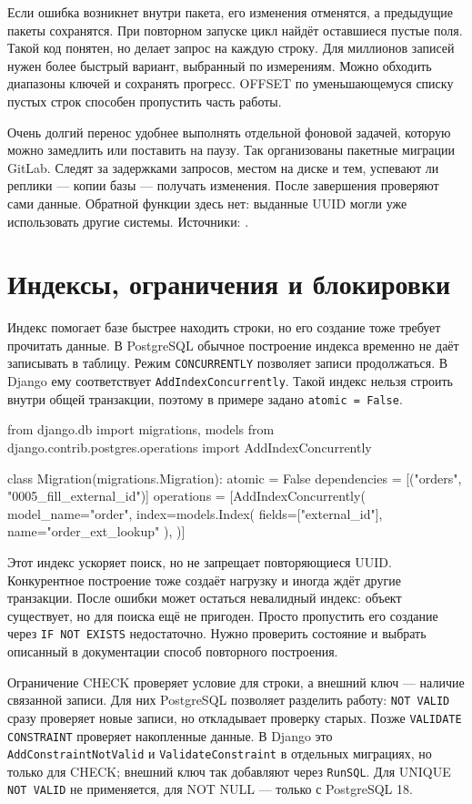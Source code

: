 \documentclass[11pt,a4paper]{article}
\newcommand{\src}[1]{{\small\color{muted}Источники: #1.}}
\newcommand{\parthead}[1]{\Needspace{10\baselineskip}\section{#1}}
\begin{document}
Если ошибка возникнет внутри пакета, его изменения отменятся, а предыдущие пакеты сохранятся. При повторном запуске цикл найдёт оставшиеся пустые поля. Такой код понятен, но делает запрос на каждую строку. Для миллионов записей нужен более быстрый вариант, выбранный по измерениям. Можно обходить диапазоны ключей и сохранять прогресс. OFFSET по уменьшающемуся списку пустых строк способен пропустить часть работы.

Очень долгий перенос удобнее выполнять отдельной фоновой задачей, которую можно замедлить или поставить на паузу. Так организованы пакетные миграции GitLab. Следят за задержками запросов, местом на диске и тем, успевают ли реплики --- копии базы --- получать изменения. После завершения проверяют сами данные. Обратной функции здесь нет: выданные UUID могли уже использовать другие системы.
\src{\cite{writing,transactions,querysets,gitlabbatches}}

\parthead{Индексы, ограничения и блокировки}

Индекс помогает базе быстрее находить строки, но его создание тоже требует прочитать данные. В PostgreSQL обычное построение индекса временно не даёт записывать в таблицу. Режим \texttt{CONCURRENTLY} позволяет записи продолжаться. В Django ему соответствует \texttt{AddIndex\allowbreak Concurrently}. Такой индекс нельзя строить внутри общей транзакции, поэтому в примере задано \texttt{atomic = False}.
\begin{code}
from django.db import migrations, models
from django.contrib.postgres.operations import AddIndexConcurrently

class Migration(migrations.Migration):
    atomic = False
    dependencies = [("orders", "0005_fill_external_id")]
    operations = [AddIndexConcurrently(
        model_name="order",
        index=models.Index(
            fields=["external_id"], name="order_ext_lookup"
        ),
    )]
\end{code}
Этот индекс ускоряет поиск, но не запрещает повторяющиеся UUID. Конкурентное построение тоже создаёт нагрузку и иногда ждёт другие транзакции. После ошибки может остаться невалидный индекс: объект существует, но для поиска ещё не пригоден. Просто пропустить его создание через \texttt{IF NOT EXISTS} недостаточно. Нужно проверить состояние и выбрать описанный в документации способ повторного построения.

Ограничение CHECK проверяет условие для строки, а внешний ключ --- наличие связанной записи. Для них PostgreSQL позволяет разделить работу: \texttt{NOT VALID} сразу проверяет новые записи, но откладывает проверку старых. Позже \texttt{VALIDATE CONSTRAINT} проверяет накопленные данные. В Django это \texttt{AddConstraintNotValid} и \texttt{ValidateConstraint} в отдельных миграциях, но только для CHECK; внешний ключ так добавляют через \texttt{RunSQL}. Для UNIQUE \texttt{NOT VALID} не применяется, для NOT NULL --- только с PostgreSQL 18.
\end{document}
